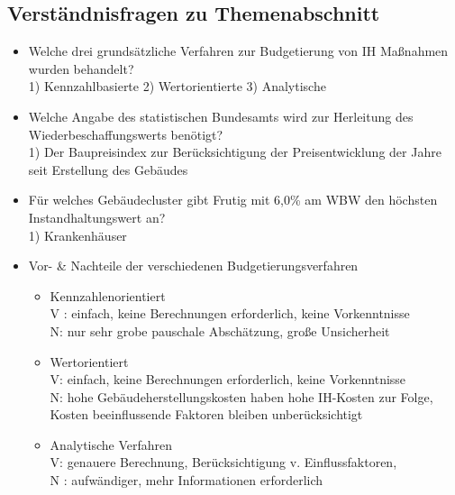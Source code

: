 \documentclass[fleqn,twoside,dvipsnames]{article}
\begin{document}
    \subsection{Verständnisfragen zu Themenabschnitt} \label{WBW2}
        \begin{itemize}
            \item Welche drei grundsätzliche Verfahren zur Budgetierung von $\mathrm{IH}$ Maßnahmen wurden behandelt?\\
            1) Kennzahlbasierte 2) Wertorientierte 3) Analytische
            \item Welche Angabe des statistischen Bundesamts wird zur Herleitung des Wiederbeschaffungswerts benötigt?\\
            1) Der Baupreisindex zur Berücksichtigung der Preisentwicklung der Jahre seit Erstellung des Gebäudes
            \item Für welches Gebäudecluster gibt Frutig mit 6,0\% am WBW den höchsten Instandhaltungswert an?\\
            1) Krankenhäuser

            \item Vor- \& Nachteile der verschiedenen Budgetierungsverfahren 
                \begin{itemize}
                    \item Kennzahlenorientiert\\
                    V : einfach, keine Berechnungen erforderlich, keine Vorkenntnisse\\
                    N: nur sehr grobe pauschale Abschätzung, große Unsicherheit
                    \item Wertorientiert\\
                    V: einfach, keine Berechnungen erforderlich, keine Vorkenntnisse\\
                    N: hohe Gebäudeherstellungskosten haben hohe IH-Kosten zur Folge, Kosten beeinflussende Faktoren bleiben unberücksichtigt
                    \item Analytische Verfahren\\
                    V: genauere Berechnung, Berücksichtigung v. Einflussfaktoren,\\
                    N : aufwändiger, mehr Informationen erforderlich
                \end{itemize}
        \end{itemize}

\newpage
        
\end{document}
